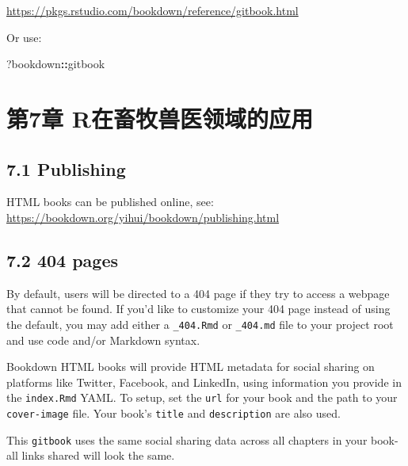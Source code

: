 \documentclass[
]{book}
\newenvironment{Shaded}{\begin{snugshade}}{\end{snugshade}}
\newcommand{\NormalTok}[1]{#1}
\newcommand{\SpecialCharTok}[1]{\textcolor[rgb]{0.81,0.36,0.00}{\textbf{#1}}}
\theoremstyle{definition}
\theoremstyle{definition}
\theoremstyle{definition}
\theoremstyle{definition}
\theoremstyle{remark}
\begin{document}
\url{https://pkgs.rstudio.com/bookdown/reference/gitbook.html}

Or use:

\begin{Shaded}
\begin{Highlighting}[]
\NormalTok{?bookdown}\SpecialCharTok{::}\NormalTok{gitbook}
\end{Highlighting}
\end{Shaded}

\hypertarget{ux7b2c7ux7ae0-rux5728ux755cux7267ux517dux533bux9886ux57dfux7684ux5e94ux7528}{%
\chapter*{第7章 R在畜牧兽医领域的应用}\label{ux7b2c7ux7ae0-rux5728ux755cux7267ux517dux533bux9886ux57dfux7684ux5e94ux7528}}

\hypertarget{publishing-1}{%
\section*{7.1 Publishing}\label{publishing-1}}

HTML books can be published online, see: \url{https://bookdown.org/yihui/bookdown/publishing.html}

\hypertarget{pages-1}{%
\section*{7.2 404 pages}\label{pages-1}}

By default, users will be directed to a 404 page if they try to access a webpage that cannot be found. If you'd like to customize your 404 page instead of using the default, you may add either a \texttt{\_404.Rmd} or \texttt{\_404.md} file to your project root and use code and/or Markdown syntax.

Bookdown HTML books will provide HTML metadata for social sharing on platforms like Twitter, Facebook, and LinkedIn, using information you provide in the \texttt{index.Rmd} YAML. To setup, set the \texttt{url} for your book and the path to your \texttt{cover-image} file. Your book's \texttt{title} and \texttt{description} are also used.

This \texttt{gitbook} uses the same social sharing data across all chapters in your book- all links shared will look the same.
\end{document}
